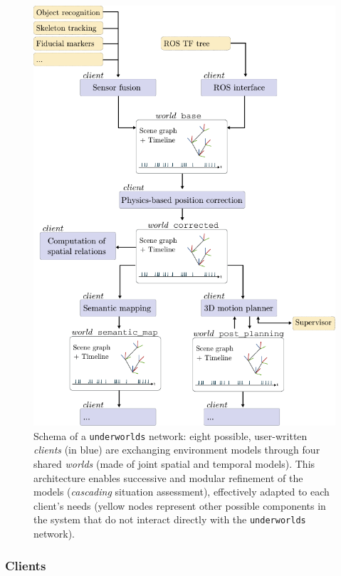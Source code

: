 \documentclass[letterpaper, 10 pt, conference]{ieeeconf}  %
\newcommand{\uwds}{{\tt underworlds}\xspace}
\begin{document}
\begin{figure}
    \centering
    \includegraphics[width=\linewidth]{overview}
    \caption{Schema of a \uwds network: eight possible, user-written
    \emph{clients} (in blue) are exchanging environment models through four shared
    \emph{worlds} (made of joint spatial and temporal models). This architecture
    enables successive and modular refinement of the models
    (\emph{cascading} situation assessment), effectively adapted to each
    client's needs (yellow nodes represent other possible components in the system that do not
    interact directly with the \uwds network).}

    \label{fig|scene}

\end{figure}

\subsubsection{Clients}
\end{document}

